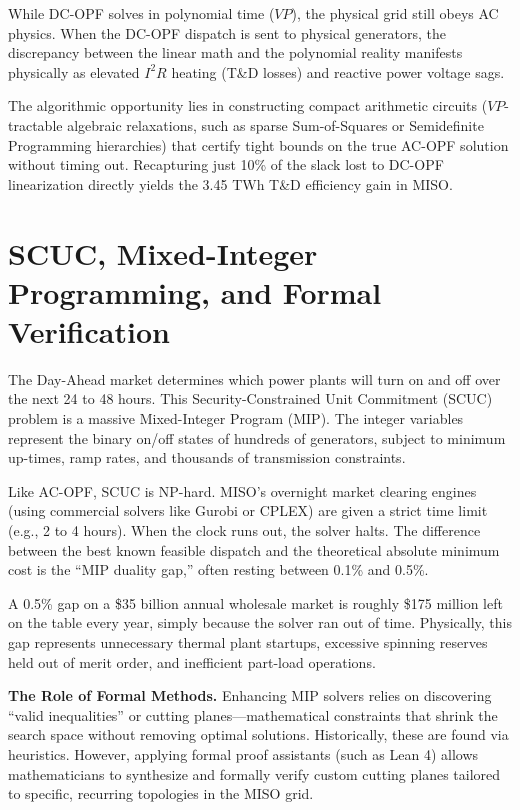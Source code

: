 \documentclass[11pt, a4paper]{article}
\newcommand{\para}[1]{\par\medskip\noindent\textbf{#1}\quad}
\begin{document}
While DC-OPF solves in polynomial time ($VP$), the physical grid still obeys AC physics. When the DC-OPF dispatch is sent to physical generators, the discrepancy between the linear math and the polynomial reality manifests physically as elevated $I^2R$ heating (T\&D losses) and reactive power voltage sags. 

The algorithmic opportunity lies in constructing compact arithmetic circuits ($VP$-tractable algebraic relaxations, such as sparse Sum-of-Squares or Semidefinite Programming hierarchies) that certify tight bounds on the true AC-OPF solution without timing out. Recapturing just 10\% of the slack lost to DC-OPF linearization directly yields the 3.45 TWh T\&D efficiency gain in MISO.

\section{SCUC, Mixed-Integer Programming, and Formal Verification}

The Day-Ahead market determines which power plants will turn on and off over the next 24 to 48 hours. This Security-Constrained Unit Commitment (SCUC) problem is a massive Mixed-Integer Program (MIP). The integer variables represent the binary on/off states of hundreds of generators, subject to minimum up-times, ramp rates, and thousands of transmission constraints.

Like AC-OPF, SCUC is NP-hard. MISO's overnight market clearing engines (using commercial solvers like Gurobi or CPLEX) are given a strict time limit (e.g., 2 to 4 hours). When the clock runs out, the solver halts. The difference between the best known feasible dispatch and the theoretical absolute minimum cost is the ``MIP duality gap,'' often resting between 0.1\% and 0.5\%.

A 0.5\% gap on a \$35 billion annual wholesale market is roughly \$175 million left on the table every year, simply because the solver ran out of time. Physically, this gap represents unnecessary thermal plant startups, excessive spinning reserves held out of merit order, and inefficient part-load operations.

\para{The Role of Formal Methods.} 
Enhancing MIP solvers relies on discovering ``valid inequalities'' or cutting planes—mathematical constraints that shrink the search space without removing optimal solutions. Historically, these are found via heuristics. However, applying formal proof assistants (such as Lean 4) allows mathematicians to synthesize and formally verify custom cutting planes tailored to specific, recurring topologies in the MISO grid. 
\end{document}
